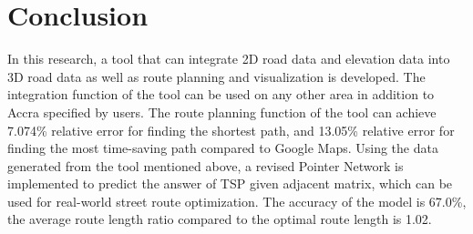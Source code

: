\documentclass[final-report]{report-template}
\begin{document}
\section{Conclusion}
In this research, a tool that can integrate 2D road data and elevation data into 3D road data as well as route planning and visualization is developed.
The integration function of the tool can be used on any other area in addition to Accra specified by users. 
The route planning function of the tool can achieve 7.074\% relative error for finding the shortest path,
and 13.05\% relative error for finding the most time-saving path compared to Google Maps.
Using the data generated from the tool mentioned above, 
a revised Pointer Network is implemented to predict the answer of TSP given adjacent matrix, 
which can be used for real-world street route optimization.
The accuracy of the model is 67.0\%, the average route length ratio compared to the optimal route length is 1.02.


\end{document}
